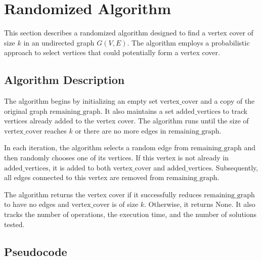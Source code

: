 \section{Randomized Algorithm}

This section describes a randomized algorithm designed to find a vertex cover of size \( k \) in an undirected graph \( G(V, E) \). The algorithm employs a probabilistic approach to select vertices that could potentially form a vertex cover.


\subsection{Algorithm Description}

The algorithm begins by initializing an empty set \( \text{{vertex\_cover}} \) and a copy of the original graph \( \text{{remaining\_graph}} \). It also maintains a set \( \text{{added\_vertices}} \) to track vertices already added to the vertex cover. The algorithm runs until the size of \( \text{{vertex\_cover}} \) reaches \( k \) or there are no more edges in \( \text{{remaining\_graph}} \).

In each iteration, the algorithm selects a random edge from \( \text{{remaining\_graph}} \) and then randomly chooses one of its vertices. If this vertex is not already in \( \text{{added\_vertices}} \), it is added to both \( \text{{vertex\_cover}} \) and \( \text{{added\_vertices}} \). Subsequently, all edges connected to this vertex are removed from \( \text{{remaining\_graph}} \).

The algorithm returns the vertex cover if it successfully reduces \( \text{{remaining\_graph}} \) to have no edges and \( \text{{vertex\_cover}} \) is of size \( k \). Otherwise, it returns None. It also tracks the number of operations, the execution time, and the number of solutions tested.

\subsection{Pseudocode}

